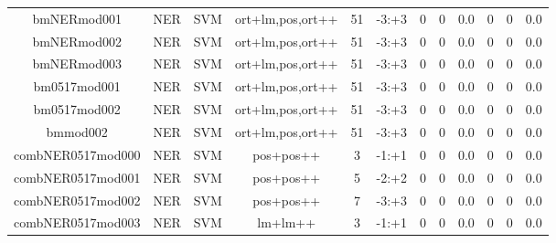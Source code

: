 \documentclass[a4paper]{article}
\begin{document}
\begin{landscape}
\begin{center}
\begin{tabular}{ |c|c|c|c|c|c|c|c|c|c|c|c|}
 
 	
 	\small{ bmNERmod001 } & \small{ NER} & \small{  SVM }  & ort+lm,pos,ort++  &  51 &  \small{  -3:+3 }  &  0 & 0 & 0.0  &  0 & 0 & 0.0 \\
 	

 
 	
 	\small{ bmNERmod002 } & \small{ NER} & \small{  SVM }  & ort+lm,pos,ort++  &  51 &  \small{  -3:+3 }  &  0 & 0 & 0.0  &  0 & 0 & 0.0 \\
 	

 
 	
 	\small{ bmNERmod003 } & \small{ NER} & \small{  SVM }  & ort+lm,pos,ort++  &  51 &  \small{  -3:+3 }  &  0 & 0 & 0.0  &  0 & 0 & 0.0 \\
 	

 
 	
 	\small{ bm0517mod001 } & \small{ NER} & \small{  SVM }  & ort+lm,pos,ort++  &  51 &  \small{  -3:+3 }  &  0 & 0 & 0.0  &  0 & 0 & 0.0 \\
 	

 
 	
 	\small{ bm0517mod002 } & \small{ NER} & \small{  SVM }  & ort+lm,pos,ort++  &  51 &  \small{  -3:+3 }  &  0 & 0 & 0.0  &  0 & 0 & 0.0 \\
 	

 
 	
 	\small{ bmmod002 } & \small{ NER} & \small{  SVM }  & ort+lm,pos,ort++  &  51 &  \small{  -3:+3 }  &  0 & 0 & 0.0  &  0 & 0 & 0.0 \\
 	

 
 	
 	\small{ combNER0517mod000 } & \small{ NER} & \small{  SVM }  & pos+pos++  &  3 &  \small{  -1:+1 }  &  0 & 0 & 0.0  &  0 & 0 & 0.0 \\
 	

 
 	
 	\small{ combNER0517mod001 } & \small{ NER} & \small{  SVM }  & pos+pos++  &  5 &  \small{  -2:+2 }  &  0 & 0 & 0.0  &  0 & 0 & 0.0 \\
 	

 
 	
 	\small{ combNER0517mod002 } & \small{ NER} & \small{  SVM }  & pos+pos++  &  7 &  \small{  -3:+3 }  &  0 & 0 & 0.0  &  0 & 0 & 0.0 \\
 	

 
 	
 	\small{ combNER0517mod003 } & \small{ NER} & \small{  SVM }  & lm+lm++  &  3 &  \small{  -1:+1 }  &  0 & 0 & 0.0  &  0 & 0 & 0.0 \\
 	


\end{tabular}
\end{center}
\end{landscape}
\end{document}
